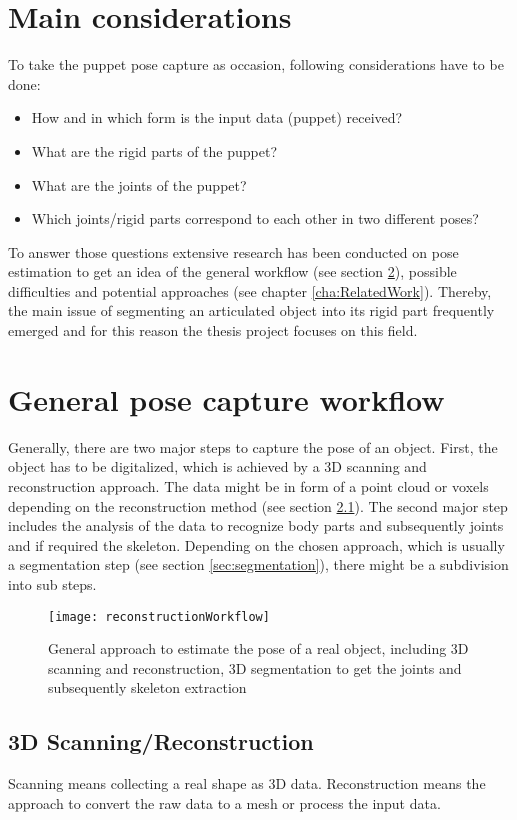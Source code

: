 \section{Main considerations}
To take the puppet pose capture as occasion, following considerations have to be done:
\begin{itemize}
	\item How and in which form is the input data (puppet) received?
	\item What are the rigid parts of the puppet?
	\item What are the joints of the puppet?
	\item Which joints/rigid parts correspond to each other in two different poses?	
\end{itemize}
To answer those questions extensive research has been conducted on pose estimation to get an idea of the general workflow (see section \ref{PoseCapture}), possible difficulties and potential approaches (see chapter \ref{cha:RelatedWork}). Thereby, the main issue of segmenting an articulated object into its rigid part frequently emerged and for this reason the thesis project focuses on this field.

\section{General pose capture workflow}
\label{PoseCapture}
Generally, there are two major steps to capture the pose of an object. First, the object has to be digitalized, which is achieved by a 3D scanning and reconstruction approach. The data might be in form of a point cloud or voxels depending on the reconstruction method (see section \ref{sec:reconstruction}). The second major step includes the analysis of the data to recognize body parts and subsequently joints and if required the skeleton. Depending on the chosen approach, which is usually a segmentation step (see section \ref{sec:segmentation}), there might be a subdivision into sub steps.
%
%
\begin{figure}
	\centering
	\texttt{[image: reconstructionWorkflow]}
	\caption{General approach to estimate the pose of a real object, including 3D scanning and reconstruction, 3D segmentation to get the joints and subsequently skeleton extraction}
	\label{fig:posecapture}
\end{figure}
%
\subsection{3D Scanning/Reconstruction}
\label{sec:reconstruction}
%
%
Scanning means collecting a real shape as 3D data. Reconstruction means the approach to convert the raw data to a mesh or process the input data.

